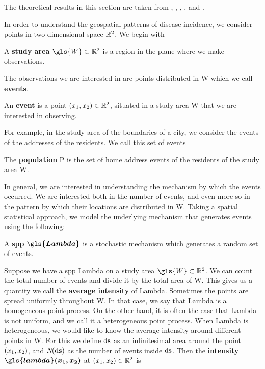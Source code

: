 The theoretical results in this section are taken from \citet{diggle1983spatial},
\citet{diggle1988equivalence},
\citet{guan2008consistent},
\citet{silverman1986density},
and \citet{wand1994kernel}.

In order to understand the geospatial patterns of disease incidence,
we consider points in two-dimensional space $\mathbb{R}^2$.
We begin with

\begin{defn}
    A \textbf{study area} $\gls{W} \subset \RS$ is a region in the plane where we make observations.
\end{defn}

The observations we are interested in are points distributed in \gls{W} which we call \textbf{events}.

\begin{defn}
    \label{defn:event}
    An \textbf{event} is a point $(x_1, x_2) \in \mathbb{R}^2$, situated in a study area \gls{W} that we are interested in observing.
\end{defn}

For example, in the study area of the boundaries of a city, we consider the events of the addresses of the residents.
We call this set of events

\begin{defn}
    The \textbf{population} \gls{P} is the set of home address events of the residents of the study area \gls{W}.
\end{defn}

In general, we are interested in understanding the mechanism by which the events occurred.
We are interested both in the number of events, and even more so in the pattern by which their locations are distributed in \gls{W}.
Taking a spatial statistical approach, we model the underlying mechanism that generates events using the following:

\begin{defn}
    A \textbf{\gls{spp}} $\boldsymbol{\gls{Lambda}}$ is a stochastic mechanism which generates a random set of events.
\end{defn}

Suppose we have a \gls{spp} \gls{Lambda} on a study area $\gls{W} \subset \RS$.
We can count the total number of \glspl{event} and divide it by the total area of \gls{W}.
This gives us a quantity we call the \textbf{average \gls{intensity}} of \gls{Lambda}.
Sometimes the points are spread uniformly throughout \gls{W}.
In that case, we say that \gls{Lambda} is a homogeneous point process.
On the other hand, it is often the case that \gls{Lambda} is not uniform,
and we call it a heterogeneous point process.
When \gls{Lambda} is heterogeneous,
we would like to know the average \gls{intensity} around different points in \gls{W}.
For this
we define $\mathop{}\!\mathrm{d}{\mathbf{s}}$ as an infinitesimal area around the point $(x_1, x_2)$,
and $N\!(\mathop{}\!\mathrm{d}{\mathbf{s}})$ as the number of \glspl{event} inside $\mathop{}\!\mathrm{d}{\mathbf{s}}$.
Then the \textbf{\gls{intensity}} $\boldsymbol{\gls{lambda}\xvec}$ at $(x_1, x_2) \in \mathbb{R}^2$ is

